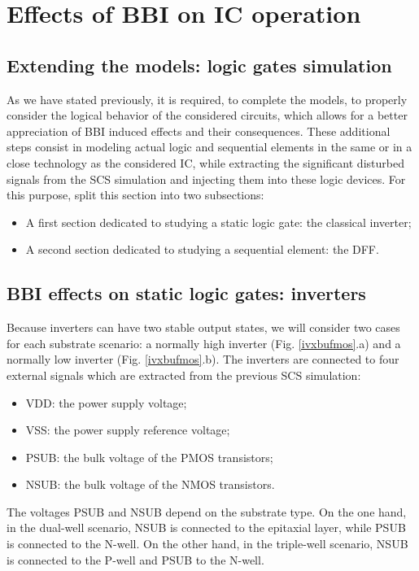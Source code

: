 
\section{Effects of BBI on IC operation}
\subsection{Extending the models: logic gates simulation}
	As we have stated previously, it is required, to complete the models, to properly consider the logical behavior of the considered circuits, which allows for a better appreciation of BBI induced effects and their consequences.
	These additional steps consist in modeling actual logic and sequential elements in the same or in a close technology as the considered IC, while extracting the significant disturbed signals from the SCS simulation and injecting them into these logic devices.
	For this purpose, split this section into two subsections:
	\begin{itemize}
		\item A first section dedicated to studying a static logic gate: the classical inverter;
		\item A second section dedicated to studying a sequential element: the DFF.
	\end{itemize}

\subsection{BBI effects on static logic gates: inverters}
	
	Because inverters can have two stable output states, we will consider two cases for each substrate scenario: a normally high inverter (Fig. \ref{ivxbufmos}.a) and a normally low inverter (Fig. \ref{ivxbufmos}.b).
	The inverters are connected to four external signals which are extracted from the previous SCS simulation:
	\begin{itemize}
			\item VDD: the power supply voltage;
			\item VSS: the power supply reference voltage;
			\item PSUB: the bulk voltage of the PMOS transistors;
			\item NSUB: the bulk voltage of the NMOS transistors.
		\end{itemize}
	The voltages PSUB and NSUB depend on the substrate type.
	On the one hand, in the dual-well scenario, NSUB is connected to the epitaxial layer, while PSUB is connected to the N-well.
	On the other hand, in the triple-well scenario, NSUB is connected to the P-well and PSUB to the N-well.


